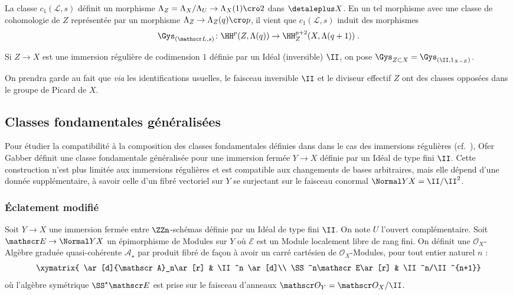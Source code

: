 \documentclass[10pt]{../fichiers-configuration-latex/smfart}
\begin{document}
La classe $c_1(\mathscr L,s)$ définit un morphisme
$\Lambda_Z=\Lambda_X/\Lambda_U\to \Lambda_X(1)\cro 2$ dans $\detaleplus X$. En
 un tel morphisme avec une classe de cohomologie de $Z$
représentée par un morphisme $\Lambda_Z\to\Lambda_Z(q)\cro p$, il vient que
$c_1(\mathscr L,s)$ induit des morphismes \[\Gys_{(\mathscr L,s)}\colon
\HH^p(Z,\Lambda(q))\to \HH^{p+2}_Z(X,\Lambda(q+1))\;\text{.}\]

\begin{definition2}
Si $Z\to X$ est une immersion régulière de codimension $1$ définie par un
Idéal (inversible) $\II$, on pose $\Gys_{Z\subset X}=\Gys_{(\II
,1_{X-Z})}$.
\end{definition2}

On prendra garde au fait que \emph{via} les identifications usuelles, le
faisceau inversible $\II$ et le diviseur effectif $Z$ ont des
classes opposées dans le groupe de Picard de $X$.


\subsection{Classes fondamentales généralisées}%

Pour étudier la compatibilité à la composition des classes
fondamentales définies dans \cite[§1]{AZUMINO@Fujiwara} dans le cas des
immersions régulières (cf.~),
Ofer Gabber définit une classe fondamentale
généralisée pour une immersion fermée $Y\to X$ définie par un Idéal de
type fini $\II$. Cette construction n'est plus limitée aux
immersions régulières et est compatible aux 
changements de bases arbitraires, mais elle 
dépend d'une donnée supplémentaire, à savoir celle d'un fibré vectoriel
sur $Y$ se surjectant sur le faisceau conormal $\Normal Y X=\II/\II^2$.

\subsubsection{Éclatement modifié}%

Soit $Y\to X$ une immersion fermée entre $\ZZn$-schémas définie 
par un Idéal de type fini $\II$. On note $U$ l'ouvert complémentaire.
Soit $\mathscr E
\to \Normal Y X$ un épimorphisme de Modules sur $Y$ où 
$\mathscr E$ est un Module localement libre de rang fini.
On définit une $\mathscr O_X$-Algèbre graduée quasi-cohérente $\mathscr
A_\star$ par produit fibré de façon à 
avoir un carré cartésien de $\mathscr O_X$-Modules,
pour tout entier naturel $n$ :
\[
\xymatrix{
\ar[d]{\mathscr A}_n\ar[r] & \II^n \ar[d]\\
\SS^n\mathscr E\ar[r] & \II^n/\II^{n+1}}
\]
où l'algèbre symétrique $\SS^\star\mathscr E$ est prise sur le faisceau
d'anneaux $\mathscr O_Y=\mathscr O_X/\II$.
\end{document}

